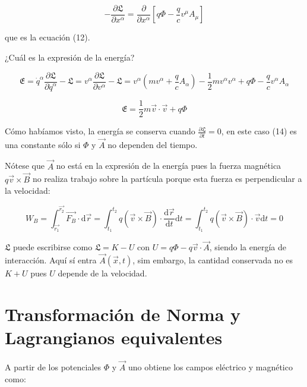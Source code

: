 \documentclass{article}
\begin{document}
\begin{equation*}
   -\frac{\partial \mathfrak{L}}{\partial x^{\alpha}} = \frac{\partial }{\partial x^{\alpha}} \left [ q\Phi - \frac{q}{c}v^{\mu}A_{\mu} \right ]  
\end{equation*}

que es la ecuación (12).

¿Cuál es la expresión de la energía?

\begin{equation*}
\mathfrak{E} = \dot{q}^{\alpha} \frac{\partial \mathfrak{L}}{\partial \dot q^{\alpha}} - \mathfrak{L} = v^{\alpha}\frac{\partial \mathfrak{L}}{\partial v^{\alpha}} - \mathfrak{L} = v^{\alpha}\left ( mv^{\alpha}  + \frac{q}{c}A_{\alpha} \right ) - \frac{1}{2}mv^{\alpha}v^{\alpha} + q\Phi - \frac{q}{c}v^{\alpha}A_{\alpha}
\end{equation*}

\begin{equation}
\mathfrak{E} = \frac{1}{2}m\vec{v}\cdot\vec{v} + q\Phi
\end{equation}

Cómo habíamos visto, la energía se conserva cuando $\frac{\partial \mathfrak{L}}{\partial t} = 0$, en este caso (14) es una constante sólo si $\Phi$ y $\vec{A}$ no dependen del tiempo.

Nótese que $\vec{A}$ no está en la expresión de la energía pues la fuerza magnética $q\vec{v}\times\vec{B}$ no realiza trabajo  sobre la partícula porque esta fuerza es perpendicular a la velocidad:

\begin{equation*}
W_{B} = \int_{\vec{r_{1}}}^{\vec{r_{2}}} \vec{F_{B}}\cdot\mathrm{d}\vec{r} = \int_{t_{1}}^{t_{2}} q\left ( \vec{v}\times\vec{B}\right )\cdot \frac{\mathrm{d} \vec{r}}{\mathrm{d} t}\mathrm{d}t = \int_{t_{1}}^{t_{2}} q\left ( \vec{v}\times\vec{B}\right )\cdot \vec{v}  \mathrm{d}t = 0
\end{equation*}

$\mathfrak{L}$ puede escribirse como $\mathfrak{L} = K - U$ con $U = q\Phi - q\vec{v}\cdot\vec{A}$, siendo la energía de interacción. Aquí sí entra $\vec{A}(\vec{x},t)$, sim embargo, la cantidad conservada no es $K + U$ pues $U$ depende de la velocidad.

\section*{Transformación de Norma y Lagrangianos equivalentes}
  
A partir de los potenciales $\Phi$ y $\vec{A}$ uno obtiene los campos eléctrico y magnético como:
\end{document}
